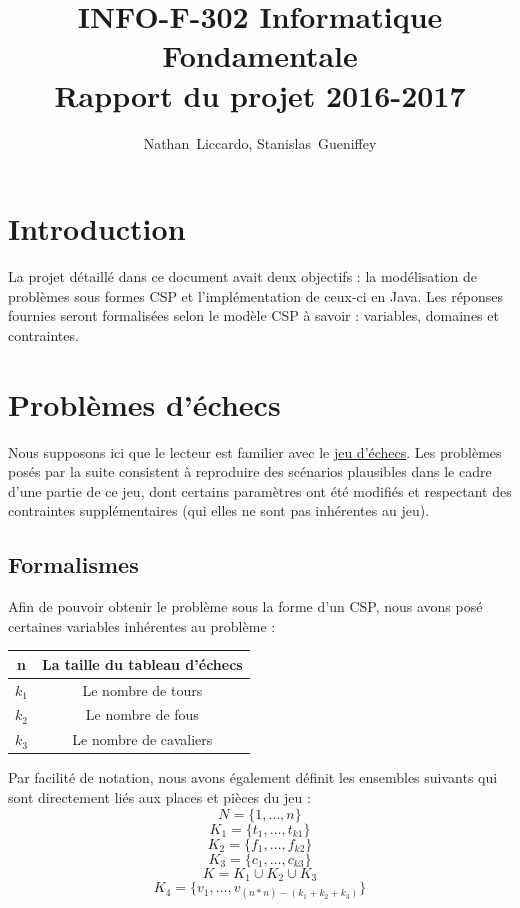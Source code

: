 \documentclass[a4paper]{article}
\title{INFO-F-302 Informatique Fondamentale \\ Rapport du projet 2016-2017}
\author{Nathan~Liccardo, Stanislas~Gueniffey}
\begin{document}
\maketitle

\section{Introduction}
La projet détaillé dans ce document avait deux objectifs : la modélisation de problèmes sous formes CSP et l'implémentation de ceux-ci en Java. Les réponses fournies seront formalisées selon le modèle CSP à savoir : variables, domaines et contraintes.

\section{Problèmes d'échecs}
Nous supposons ici que le lecteur est familier avec le \href{https://fr.wikipedia.org/wiki/%C3%89checs}{jeu d'échecs}. Les problèmes posés par la suite consistent à reproduire des scénarios plausibles dans le cadre d'une partie de ce jeu, dont certains paramètres ont été modifiés et respectant des contraintes supplémentaires (qui elles ne sont pas inhérentes au jeu).

\subsection{Formalismes}
Afin de pouvoir obtenir le problème sous la forme d'un CSP, nous avons posé certaines variables inhérentes au problème : 
\begin{center}
\begin{tabular}{|c|c|}
\hline
n & La taille du tableau d'échecs \\
\hline
$k_1$ & Le nombre de tours \\
\hline
$k_2$ & Le nombre de fous \\
\hline
$k_3$ & Le nombre de cavaliers  \\
\hline
\end{tabular}
\end{center}
Par facilité de notation, nous avons également définit les ensembles suivants qui sont directement liés aux places et pièces du jeu : 
\begin{equation*}
N = \{1,\ldots,n\}
\end{equation*}
\begin{equation*}
K_1 = \{ t_1,\ldots,t_{k1} \}
\end{equation*}
\begin{equation*}
K_2 = \{ f_1,\ldots,f_{k2} \}
\end{equation*}
\begin{equation*}
K_3 = \{ c_1,\ldots,c_{k3} \}
\end{equation*}
\begin{equation*}
K = K_1 \cup K_2 \cup K_3
\end{equation*}
\begin{equation*}
K_4 = \{ v_1,\ldots,v_{(n*n)-(k_1+k_2+k_3)} \}
\end{equation*}
\end{document}
